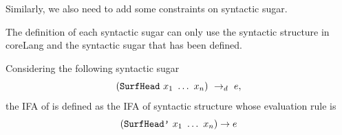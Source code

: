 Similarly, we also need to add some constraints on syntactic sugar.

\begin{Asm}
    \label{Asm:orderliness-sugar}
    The definition of each syntactic sugar can only use the syntactic structure in coreLang and the syntactic sugar that has been defined.
\end{Asm}

\begin{Def}
    \label{def:ifa-sugar}
    Considering the following syntactic sugar
    \[
        (\mbox{\tt SurfHead}~x_1~\ldots~x_n) ~\rightarrow_d~ e,
    \]
    the IFA of  is defined as the IFA of syntactic structure  whose evaluation rule is
    \[
        (\mbox{\tt SurfHead'}~x_1~\ldots~x_n) \to e
    \]

\end{Def}

